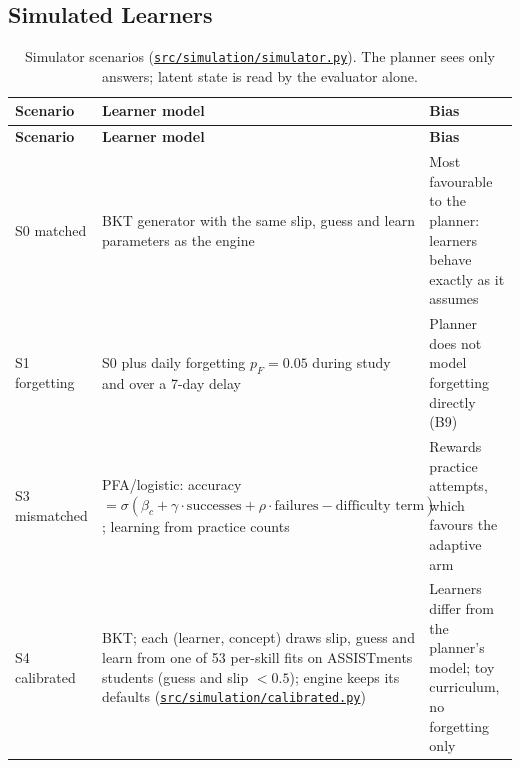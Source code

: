 \documentclass[english]{sintr}
\newcommand{\repourl}{https://github.com/Bhuvan-56/adaptive-learning-path-planner-DAT}
\newcommand{\sha}{cs5903-final-2026}
\DeclareRobustCommand{\rf}[1]{\href{\repourl/blob/\sha/#1}{\nolinkurl{#1}}}
\newcommand{\shax}{cs5903-final-2026}
\DeclareRobustCommand{\rfx}[1]{\href{\repourl/blob/\shax/#1}{\nolinkurl{#1}}}
\begin{document}
\subsection{Simulated Learners}
{\small
\begin{longtable}{|L{2.47cm}|L{7.04cm}|L{5.52cm}|}
\caption{Simulator scenarios (\rf{src/simulation/simulator.py}). The planner sees only answers; latent state is read by the evaluator alone.}\\
\hline
\textbf{Scenario} & \textbf{Learner model} & \textbf{Bias} \\ \hline
\endfirsthead
\hline \textbf{Scenario} & \textbf{Learner model} & \textbf{Bias} \\ \hline
\endhead
S0 matched & BKT generator with the same slip, guess and learn parameters as the engine & Most favourable to the planner: learners behave exactly as it assumes \\ \hline
S1 forgetting & S0 plus daily forgetting $p_F = 0.05$ during study and over a 7-day delay & Planner does not model forgetting directly (B9) \\ \hline
S3 mismatched & PFA/logistic: accuracy $=\sigma(\beta_c + \gamma\cdot\text{successes} + \rho\cdot\text{failures} - \text{difficulty term})$; learning from practice counts & Rewards practice attempts, which favours the adaptive arm \\ \hline
S4 calibrated & BKT; each (learner, concept) draws slip, guess and learn from one of 53 per-skill fits on ASSISTments students (guess and slip $<0.5$); engine keeps its defaults (\rfx{src/simulation/calibrated.py}) & Learners differ from the planner's model; toy curriculum, no forgetting only \\ \hline
 \end{longtable}
}
\end{document}
